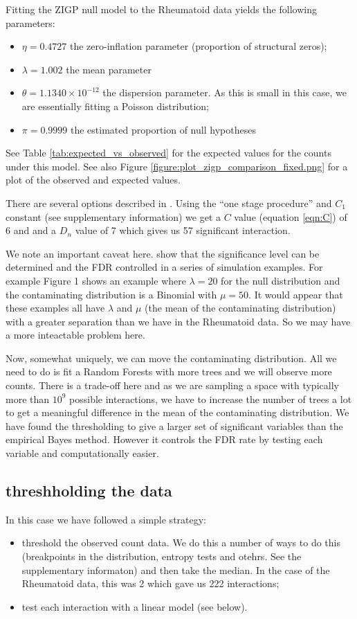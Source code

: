 \documentclass[preprint,12pt,3p]{elsarticle}
\begin{document}
Fitting the ZIGP null model to the Rheumatoid data yields the following parameters:
\begin{itemize}
\item $\eta= 0.4727$    the zero-inflation parameter (proportion of structural zeros);
\item $\lambda= 1.002$   the mean parameter
\item $\theta= 1.1340\times 10^{-12}$   the dispersion parameter. As this is small in this case, we are essentially
  fitting a Poisson distribution;
\item $\pi= 0.9999$  the estimated proportion of null hypotheses
\end{itemize}

See Table \ref{tab:expected_vs_observed} for the expected values for the counts under this model. See also Figure
\ref{figure:plot_zigp_comparison_fixed.png} for a plot of the observed and expected values.

There are several options described in  \cite{Gauran.et.al.2018}.
Using the ``one stage procedure'' and $C_1$ constant (see supplementary information)
we get a $C$ value (equation \ref{eqn:C}) of 6 and and a $D_n$ value of 7 which gives us 57 significant interaction.

We note an important caveat here.  \cite{Gauran.et.al.2018} show that the significance level can be
determined and the FDR controlled in a series of simulation examples. For example  Figure 1 \cite[]{Gauran.et.al.2018}
shows an example where $\lambda =20$ for the null distribution and the contaminating distribution is a Binomial with
$\mu=50.$ It would appear that these examples all have $\lambda$ and $\mu$ (the mean of the contaminating distribution) with a
greater separation than we have in the Rheumatoid data. So we may have a more inteactable problem here.

Now, somewhat uniquely, we can move the contaminating distribution. All we need to do is fit a Random Forests with more
trees and we will observe more counts.  There is a trade-off here and as we are sampling a space with typically more
than $10^{9}$ possible interactions, we have to increase the number of trees a lot to get a meaningful difference in the
mean of the contaminating distribution. We have found the thresholding to give a larger set of significant variables
than the empirical Bayes method. However it controls the FDR rate by testing each variable and computationally easier.

\subsection{threshholding the data}
In this case we have followed a simple strategy:
\begin{itemize}
\item threshold the observed count data. We do this a number of ways to do this (breakpoints in the distribution,
  entropy tests and otehrs. See the supplementary informaton) and then take the median. In
  the case of the Rheumatoid data, this was 2 which gave us 222 interactions;
\item test each interaction with a linear model (see below).
\end{itemize}
\end{document}
